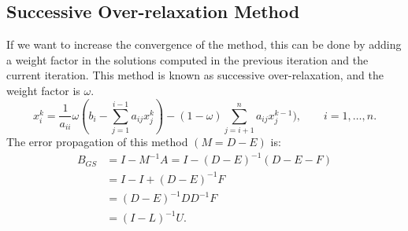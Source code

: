 \documentclass[12pt]{report}
\begin{document}
\subsection{Successive Over-relaxation Method}
If we want to increase the convergence of the method, this can be done by adding a weight factor in the solutions computed in the previous iteration
and the current iteration. This method is known as successive over-relaxation, and the weight factor is $\omega$.
\begin{equation*}
x^k_i=\frac{1}{a_{ii}}\omega(b_i-\sum_{j=1}^{i-1}a_{ij}x_{j}^{k})-(1-\omega)\sum_{j=i+1}^{n}a_{ij}x_{j}^{k-1}), \qquad i=1,\dots,n.
\end{equation*}
The error propagation of this method $(M=D-E)$ is:
\begin{align*}
 B_{GS}&=I-M^{-1}A=I-(D-E)^{-1}(D-E-F)\\
 &=I-I+(D-E)^{-1}F\\
 &=(D-E)^{-1}DD^{-1}F\\
&=(I-L)^{-1}U.
\end{align*}
\end{document}
